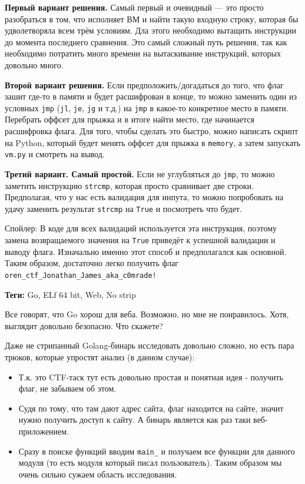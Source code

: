 \documentclass[idxtotoc,hyperref,openany,oneside]{files/reverse} %
\begin{document}
\textbf{Первый вариант решения.}
Самый первый и очевидный — это просто разобраться в том, что исполняет ВМ и найти такую входную строку, которая бы удволетворяла всем трём условиям. Дла этого необходимо вытащить инструкции до момента последнего сравнения. Это самый сложный путь решения, так как необходимо потратить много времени на вытаскивание инструкций, которых довольно много.

\textbf{Второй вариант решения.}
Если предположить/догадаться до того, что флаг зашит где-то в памяти и будет расшифрован в конце, то можно заменить один из условных \verb|jmp| (\verb|jl|, \verb|je|, \verb|jg| и т.д.) на \verb|jmp| в какое-то конкретное место в памяти. Перебрать оффсет для прыжка и в итоге найти место, где начинается расшифровка флага. Для того, чтобы сделать это быстро, можно написать скрипт на Python, который будет менять оффсет для прыжка в \verb|memory|, а затем запускать \verb|vm.py| и смотреть на вывод.

\textbf{Третий вариант. Самый простой.}
Если не углубляться до \verb|jmp|, то можно заметить инструкцию \verb|strcmp|, которая просто сравнивает две строки. Предполагая, что у нас есть валидация для инпута, то можно попробовать на удачу заменить результат \verb|strcmp| на \verb|True| и посмотреть что будет.

Спойлер: В коде для всех валидаций используется эта инструкция, поэтому замена возвращаемого значения на \verb|True| приведёт к успешной валидации и выводу флага. Изначально именно этот способ и предполагался как основной. Таким образом, достаточно легко получить флаг \verb|oren_ctf_Jonathan_James_aka_c0mrade!|




\textbf{Теги:} Go, ELf 64 bit, Web, No strip\vspace{\baselineskip}

\begin{tcolorbox}
Все говорят, что Go хорош для веба. Возможно, но мне не понравилось. Хотя, выглядит довольно безопасно. Что скажете?
\end{tcolorbox}

Даже не стрипанный Golang-бинарь исследовать довольно сложно, но есть пара трюков, которые упростят анализ (в данном случае):
\begin{itemize}
\item Т.к. это CTF-таск тут есть довольно простая и понятная идея - получить флаг, не забываем об этом.
\item Судя по тому, что там дают адрес сайта, флаг находится на сайте, значит нужно получить доступ к сайту. А бинарь является как раз таки веб-приложением.
\item Сразу в поиске функций вводим \verb|main_| и получаем все функции для данного модуля (то есть модуля который писал пользователь). Таким образом мы очень сильно сужаем область исследования.
\end{itemize}
\end{document}
